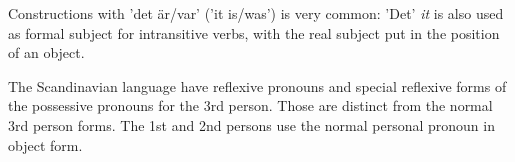 \documentclass{report}
\begin{document}
Constructions with 'det är/var' ('it is/was') is very common\cite{H&H309d}:
'Det' \emph{it} is also used as formal subject for intransitive verbs,
with the real subject put in the position of an object.

The Scandinavian language have reflexive pronouns\cite{H&H310}
and special reflexive forms of the possessive pronouns for the 3rd
person\cite{H&H319}. Those are distinct from the normal 3rd person forms.
The 1st and 2nd persons use the normal personal pronoun in object form.

\end{document}
